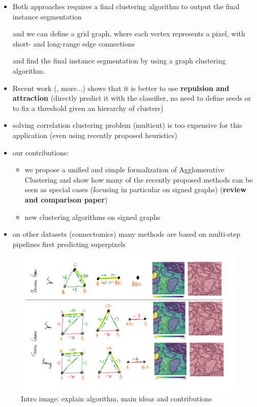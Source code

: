 \begin{itemize}
\item Both approaches requires a final clustering algorithm to output the final instance segmentation 

 and we can define a grid graph, where each vertex represents a pixel, with short- and long-range edge connections 

 and find the final instance segmentation by using a graph clustering algorithm.

\item Recent work (\cite{wolf2018mutex}, more...) shows that it is better to use \textbf{repulsion and attraction} (directly predict it with the classifier, no need to define seeds or to fix a threshold given an hierarchy of clusters)
\item solving correlation clustering problem (multicut) is too expensive for this application (even using recently proposed heuristics)
\item our contributions:
\begin{itemize}
\item we propose a unified and simple formalization of Agglomerative Clustering and show how many of the recently proposed methods can be seen as special cases (focusing in particular on signed graphs) (\textbf{review and comparison paper})
\item new clustering algorithms on signed graphs


\end{itemize}
\item on other datasets (connectomics) many methods are based on multi-step pipelines first predicting superpixels


\end{itemize}


\begin{figure}[t]
\centering
\includegraphics[width=\textwidth,trim=0.4in 1.2in 0.in 0.05in,clip]{./figs/intro_image.jpg} %
\caption{\small 
Intro image: explain algorithm, main ideas and contributions
\label{fig:intro_figure}}
\end{figure}

